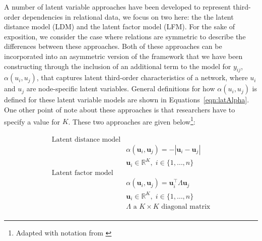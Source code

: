 \documentclass[12pt,twocolumn,twoside]{pnas-new}
\begin{document}
A number of latent variable approaches have been developed to represent third-order dependencies in relational data, we focus on two here: the the latent distance model
(LDM) and the latent factor model (LFM). For the sake of exposition, we consider the case where relations are symmetric to describe the differences between these approaches. Both of these approaches can be incorporated into an asymmetric version of the framework that we have been constructing through the inclusion of an additional term to the model for $y_{ij}$, $\alpha(u_{i}, u_{j})$, that captures latent third-order characteristics of a network, where $u_{i}$ and $u_{j}$ are node-specific latent variables. General definitions for how $\alpha(u_{i}, u_{j})$ is defined for these latent variable models are shown in Equations~\ref{eqn:latAlpha}. One other point of note about these approaches is that researchers have to specify a value for $K$.
These two approaches are given below\footnote{Adapted with notation from \citep{hoff:2008}}:

\begin{align}
\begin{aligned}
\text{Latent distance model} \\
	&\alpha(\textbf{u}_{i}, \textbf{u}_{j}) = -|\textbf{u}_{i} - \textbf{u}_{j}| \\
	&\textbf{u}_{i} \in \mathbb{R}^{K}, \; i \in \{1, \ldots, n \} \\
\text{Latent factor model} \\
	&\alpha(\textbf{u}_{i}, \textbf{u}_{j}) = \textbf{u}_{i}^{\top} \Lambda \textbf{u}_{j} \\
	&\textbf{u}_{i} \in \mathbb{R}^{K}, \; i \in \{1, \ldots, n \} \\
	&\Lambda \text{ a } K \times K \text{ diagonal matrix}
\label{eqn:latAlpha}
\end{aligned}
\end{align}
\end{document}

